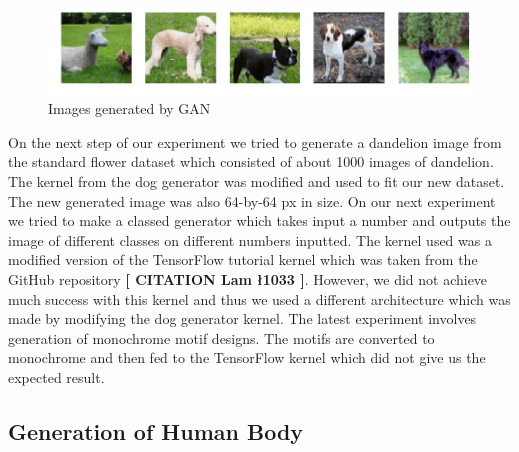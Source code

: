 \documentclass{article}
\begin{document}
    \begin{figure}[h]
        \centering
        \includegraphics[scale=0.5]{images/dogGAN.png}
        \caption{Images generated by GAN}
        \label{fig:my_label}
    \end{figure}
    On the next step of our experiment we tried to generate a dandelion image from the standard flower dataset which consisted of about 1000 images of dandelion. The kernel from the dog generator was modified and used to fit our new dataset. The new generated image was also 64-by-64 px in size.
    On our next experiment we tried to make a classed generator which takes input a number and outputs the image of different classes on different numbers inputted. The kernel used was a modified version of the TensorFlow tutorial kernel which was taken from the GitHub repository \textbf{[ CITATION Lam \l 1033 ]}. However, we did not achieve much success with this kernel and thus we used a different architecture which was made by modifying the dog generator kernel.
    The latest experiment involves generation of monochrome motif designs. The motifs are converted to monochrome and then fed to the TensorFlow kernel which did not give us the expected result.
    
    \subsection{Generation of Human Body}
    
\end{document}
